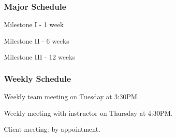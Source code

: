 \subsubsection{Major Schedule}
Milestone I - 1 week

Milestone II - 6 weeks

Milestone III - 12 weeks


\subsubsection{Weekly Schedule}
Weekly team meeting on Tuesday at 3:30PM.

Weekly meeting with instructor on Thursday at 4:30PM.

Client meeting: by appointment.